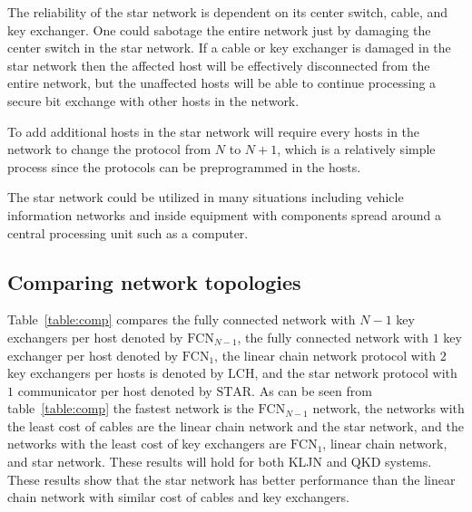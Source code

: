 \documentclass[a4paper,12pt,pdftex]{article}
\begin{document}
The reliability of the star network is dependent on its center switch, cable, and key exchanger. One could sabotage the entire network just by damaging the center switch in the star network. If a cable or key exchanger is damaged in the star network then the affected host will be effectively disconnected from the entire network, but the unaffected hosts will be able to continue processing a secure bit exchange with other hosts in the network. 

To add additional hosts in the star network will require every hosts in the network to change the protocol from $N$ to $N+1$, which is a relatively simple process since the protocols can be preprogrammed in the hosts.

The star network could be utilized in many situations including vehicle information networks \cite{c181, c185} and inside equipment with components spread around a central processing unit such as a computer.






\subsection{Comparing network topologies}

Table~\ref{table:comp} compares the fully connected network with $N-1$ key exchangers per host denoted by $\mathrm{FCN}_{N-1}$, the fully connected network with $1$ key exchanger per host denoted by $\mathrm{FCN}_{1}$, the linear chain network protocol with $2$ key exchangers per hosts is denoted by $\mathrm{LCH}$, and the star network protocol with $1$ communicator per host denoted by  $\mathrm{STAR}$. As can be seen from table~\ref{table:comp} the fastest network is the $\mathrm{FCN}_{N-1}$ network, the networks with the least cost of cables are the linear chain network and the star network, and the networks with the least cost of key exchangers are $\mathrm{FCN}_{1}$, linear chain network, and star network. These results will hold for both KLJN and QKD systems. These results show that the star network has better performance than the linear chain network with similar cost of cables and key exchangers.
\end{document}
